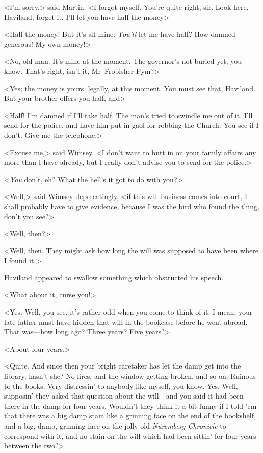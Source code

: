 <I'm sorry,> said Martin. <I forgot myself. You're quite right, sir. Look here, Haviland, forget it. I'll let you have half the money\longdash>

<Half the money! But it's all mine. \textit{You'll} let me have half? How damned generous! My own money!>

<No, old man. It's mine at the moment. The governor's not buried yet, you know. That's right, isn't it, Mr~Frobisher-Pym?>

<Yes; the money is yours, legally, at this moment. You must see that, Haviland. But your brother offers you half, and\longdash>

<Half! I'm damned if I'll take half. The man's tried to swindle me out of it. I'll send for the police, and have him put in gaol for robbing the Church. You see if I don't. Give me the telephone.>

<Excuse me,> said Wimsey. <I don't want to butt in on your family affairs any more than I have already, but I really don't advise you to send for the police.>

<\textit{You} don't, eh? What the hell's it got to do with you?>

<Well,> said Wimsey deprecatingly, <if this will business comes into court, I shall probably have to give evidence, because I was the bird who found the thing, don't you see?>

<Well, then?>

<Well, then. They might ask how long the will was supposed to have been where I found it.>

Haviland appeared to swallow something which obstructed his speech.

<What about it, curse you!>

<Yes. Well, you see, it's rather odd when you come to think of it. I mean, your late father must have hidden that will in the bookcase before he went abroad. That was—how long ago? Three years? Five years?>

<About four years.>

<Quite. And since then your bright caretaker has let the damp get into the library, hasn't she? No fires, and the window getting broken, and so on. Ruinous to the books. Very distressin' to anybody like myself, you know. Yes. Well, supposin' they asked that question about the will—and you said it had been there in the damp for four years. Wouldn't they think it a bit funny if I told 'em that there was a big damp stain like a grinning face on the end of the bookshelf, and a big, damp, grinning face on the jolly old \textit{Nüremberg Chronicle} to correspond with it, and no stain on the will which had been sittin' for four years between the two?>

